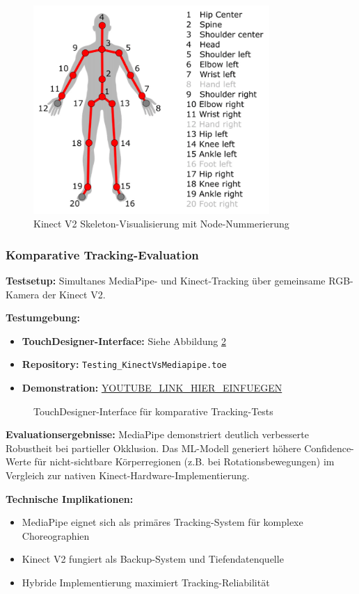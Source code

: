 \begin{figure}[H]
    \centering
    \includegraphics[width=0.8\textwidth]{images/kinect_nodes.png}
    \caption{Kinect V2 Skeleton-Visualisierung mit Node-Nummerierung}
    \label{fig:kinect_nodes}
\end{figure}

\subsubsection{Komparative Tracking-Evaluation}

\textbf{Testsetup:}
Simultanes MediaPipe- und Kinect-Tracking über gemeinsame RGB-Kamera der Kinect V2.

\textbf{Testumgebung:}
\begin{itemize}
    \item \textbf{TouchDesigner-Interface:} Siehe Abbildung \ref{fig:testing_interface}
    \item \textbf{Repository:} \texttt{Testing\_KinectVsMediapipe.toe}
    \item \textbf{Demonstration:} \url{YOUTUBE_LINK_HIER_EINFUEGEN}
\end{itemize}

\begin{figure}[H]
    \centering
    \caption{TouchDesigner-Interface für komparative Tracking-Tests}
    \label{fig:testing_interface}
\end{figure}

\textbf{Evaluationsergebnisse:}
MediaPipe demonstriert deutlich verbesserte Robustheit bei partieller Okklusion. Das ML-Modell generiert höhere Confidence-Werte für nicht-sichtbare Körperregionen (z.B. bei Rotationsbewegungen) im Vergleich zur nativen Kinect-Hardware-Implementierung.

\textbf{Technische Implikationen:}
\begin{itemize}
    \item MediaPipe eignet sich als primäres Tracking-System für komplexe Choreographien
    \item Kinect V2 fungiert als Backup-System und Tiefendatenquelle
    \item Hybride Implementierung maximiert Tracking-Reliabilität
\end{itemize}